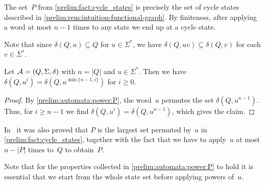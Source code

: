 The set~$P$ from \cref{prelim:fact:cycle_states}
is precisely the set of cycle states described in \cref{prelim:rem:intuition-functional-graph}.
By finiteness, after applying a word at most $n - 1$ times
to any state we end up at a cycle state. 

Note that since $\delta(Q, u) \subseteq Q$ for $u \in \Sigma^*$,
we have $\delta(Q, uv) \subseteq \delta(Q, v)$ for each $v \in \Sigma^*$.

\begin{corollary}  \label{prelim:automata:cor:power:P}
	Let $\mathcal A = (Q, \Sigma, \delta)$ with $n = |Q|$ and $u \in \Sigma^*$. 
	Then we have $\delta(Q, u^i) = \delta(Q, u^{\min\{n-1,i\}})$ for $i \ge 0$.
\end{corollary}
\begin{proof}
	 By \cref{prelim:automata:power:P}, the word~$u$
	 permutes the set $\delta(Q, u^{n-1})$.
	 Thus, for $i \ge n - 1$ we find $\delta(Q, u^i) = \delta(Q, u^{n-1})$, which gives the claim.
\end{proof}

In~\cite[Lem.~1~\&~2]{DBLP:journals/iandc/PribavkinaR11} it was also proved that $P$
is the largest set permuted by~$u$ in \cref{prelim:fact:cycle_states},
together with the fact that we have to apply~$u$ at most $n - |P|$
times to~$Q$ to obtain~$P$.

Note that for the properties collected in \cref{prelim:automata:power:P} to hold
it is essential that we start from the whole state set before applying powers of~$u$.

